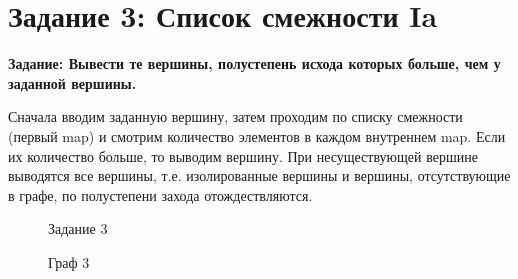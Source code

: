 \documentclass[otchet]{SCWorks}
\begin{document}
\section{Задание 3: Список смежности Ia}

\textbf{Задание: Вывести те вершины, полустепень исхода которых больше, чем у заданной вершины.}

Сначала вводим заданную вершину, затем проходим по списку смежности (первый map) и смотрим количество элементов в каждом внутреннем map. Если их количество больше, то выводим вершину. При несуществующей вершине выводятся все вершины, т.е. изолированные вершины и вершины, отсутствующие в графе, по полустепени захода отождествляются.

\begin{figure}[H]
	\caption{Задание 3}
	\label{pic3_1}
\end{figure}

\begin{figure}[H]
	\caption{Граф 3}
	\label{gr3_1}
\end{figure}
\end{document}
